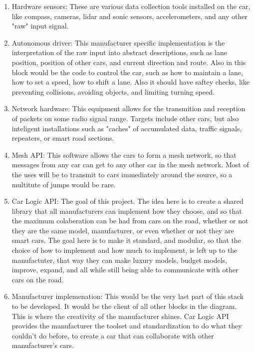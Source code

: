 \documentclass[11pt]{article}
\begin{document}
	\begin{enumerate}
		\item Hardware sensors: These are various data collection tools installed
			on the car, like compass, cameras, lidar and sonic sensors, accelerometers,
			and any other "raw" input signal.
		\item Autonomous driver: This manufacturer specific implementation
			is the interpretation of the raw input into abstract descriptions,
			such as lane position, position of other cars, and current direction
			and route. Also in this block would be the code to control the car,
			such as how to maintain a lane, how to set a speed, how to shift a lane.
			Also it should have saftey checks, like preventing collisions, avoiding
			objects, and limiting turning speed.
		\item Network hardware: This equipment allows for the transmition and
			reception of packets on some radio signal range. Targets include other
			cars, but also inteligent installations such as "caches" of accumulated
			data, traffic signals, repeaters, or smart road sections.
		\item Mesh API: This software allows the cars to form a mesh network, so that
			messages from any car can get to any other car in the mesh network. Most
			of the uses will be to transmit to cars immediately around the source, so
			a multitute of jumps would be rare.
		\item Car Logic API: The goal of this project. The idea here is to create a
			shared library that all manufacturers can implement how they choose, and
			so that the maximum colaberation can be had from cars on the road, whether
			or not they are the same model, manufacturer, or even whether or not they
			are smart cars. The goal here is to make it standard, and modular, so that
			the choice of how to implement and how much to implement, is left up to
			the manufactuter, that way they can make luxury models, budget models,
			improve, expand, and all while still being able to communicate with other
			cars on the road.
		\item Manufacturer implemenation: This would be the very last part of this
			stack to be developed. It would be the client of all other blocks in the
			diagram. This is where the creativity of the manufacturer shines.
			Car Logic API provides the manufacturer the toolset and standardization
			to do what they couldn't do before, to create a car that can collaborate
			with other manufacturer's cars.
	\end{enumerate}
\end{document}

